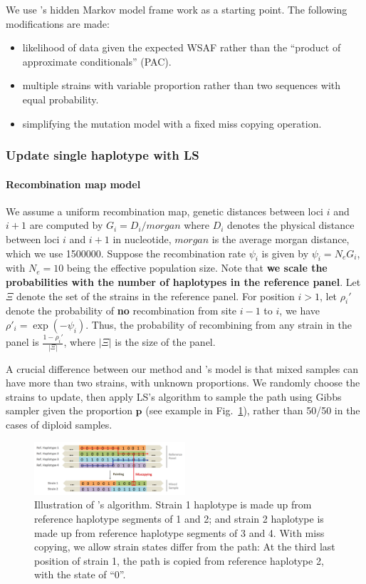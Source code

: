 \documentclass{bioinfo}
\begin{document}
We use \citet{Li2003}'s hidden Markov model frame work as a starting point. The following modifications are made:
\begin{itemize}
\item likelihood of data given the expected WSAF rather than the ``product of approximate conditionals'' (PAC).
\item multiple strains with variable proportion rather than two sequences with equal probability.
\item simplifying the mutation model with a fixed miss copying operation.
\end{itemize}

\subsubsection{Update single haplotype with LS}

\paragraph{Recombination map model}
We assume a uniform recombination map, genetic distances between loci $i$ and $i+1$ are computed by $G_i = D_i / morgan$ where $D_i$ denotes the physical distance between loci $i$ and $i+1$ in nucleotide, $morgan$ is the average morgan distance, which we use 1500000. Suppose the recombination rate $\psi_i$ is given by $\psi_i = N_e G_i$, with $N_e=10$ being the effective population size. Note that {\bf we scale the probabilities with the number of haplotypes in the reference panel}. Let $\Xi$ denote the set of the strains in the reference panel. For position $i > 1$, let $\rho_i'$ denote the probability of {\bf no} recombination from site $i-1$ to $i$, we have $\rho'_i = \exp(-\psi_i)$. Thus, the probability of recombining from any strain in the panel is $\displaystyle\frac{1-\rho_i'}{|\Xi|}$, where $|\Xi|$ is the size of the panel.


A crucial difference between our method and \citet{Li2003}'s model is that mixed samples can have more than two strains, with unknown proportions. We randomly choose the strains to update, then apply LS's algorithm to sample the path using Gibbs sampler given the proportion $\mathbf p$ (see example in Fig.~\ref{fig:ls}), rather than 50/50 in the cases of diploid samples.

\begin{figure}[ht]
\centering
\includegraphics[width=0.5\textwidth]{coupled-painting.png}
\caption{Illustration of \citet{Li2003}'s algorithm. Strain 1 haplotype is made up from reference haplotype segments of 1 and 2; and strain 2 haplotype is made up from reference haplotype segments of 3 and 4. With miss copying, we allow strain states differ from the path: At the third last position of strain 1, the path is copied from reference haplotype 2, with the state of ``0''.
}\label{fig:ls}
\end{figure}
\end{document}
